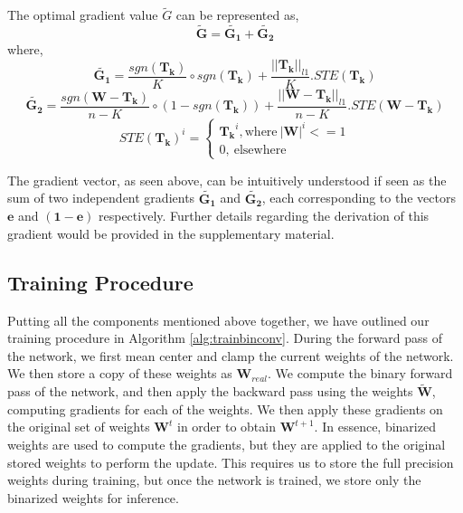 \begin{theorem}\label{theorem:backward}
The optimal gradient value $\widetilde{G}$ can be represented as,
\begin{dmath}
\widetilde{\mathbf{G}} = \widetilde{\mathbf{G_1}} + \widetilde{\mathbf{G_2}}
\end{dmath}
where,
\begin{dmath}
\widetilde{\mathbf{G_1}} = \frac{sgn(\mathbf{T_k})}{K}\circ sgn(\mathbf{T_k}) + \frac{||\mathbf{T_k}||_{l1}}{K} .STE(\mathbf{T_k})
\end{dmath}
\begin{dmath}
\widetilde{\mathbf{G_2}} = \frac{sgn(\mathbf{W}-\mathbf{T_k})}{n-K} \circ (1-sgn(\mathbf{T_k})) + \frac{||\mathbf{W}-\mathbf{T_k}||_{l1}}{n-K}.STE(\mathbf{W} - \mathbf{T_k})
\end{dmath}
\begin{equation}
STE(\mathbf{T_k})^{i} = 
    \begin{cases}
      \mathbf{T_k}^{i}, \text{where} \ |\mathbf{W}|^{i}<=1 \\
      0,\ \text{elsewhere}
    \end{cases}
\end{equation}
\end{theorem}

\noindent The gradient vector, as seen above, can be intuitively understood if seen as the sum of two independent gradients $\widetilde{\mathbf{G_1}}$ and $\widetilde{\mathbf{G_2}}$, each corresponding to the vectors $\mathbf{e}$ and $\mathbf{(1-e)}$ respectively. Further details regarding the derivation of this gradient would be provided in the supplementary material.

\subsection{Training Procedure}

\noindent Putting all the components mentioned above together, we have outlined our training procedure in Algorithm \ref{alg:trainbinconv}. During the forward pass of the network, we first mean center and clamp the current weights of the network. We then store a copy of these weights as $\mathbf{W}_{real}$. We compute the binary forward pass of the network, and then apply the backward pass using the weights $\widetilde{\mathbf{W}}$, computing gradients for each of the weights. We then apply these gradients on the original set of weights $\mathbf{W}^t$ in order to obtain $\mathbf{W}^{t+1}$. In essence, binarized weights are used to compute the gradients, but they are applied to the original stored weights to perform the update. This requires us to store the full precision weights during training, but once the network is trained, we store only the binarized weights for inference.

